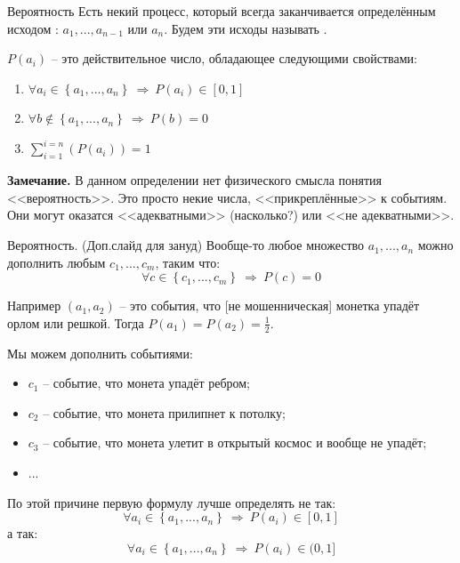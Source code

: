 \begin{frame}{Вероятность}
	Есть некий процесс, который всегда заканчивается определённым исходом : $a_1, ..., a_{n-1}$ или $a_n$.
	Будем эти исходы называть .
	
	 $P(a_i)$ -- это действительное число, обладающее следующими свойствами:
\begin{enumerate}
	\item $\forall a_i \in \left\{a_1, ..., a_n \right\} ~\Longrightarrow~ P(a_i) \in [0, 1]$
	\item $\forall b \notin \left\{a_1, ..., a_n \right\} ~\Longrightarrow~ P(b) = 0$
	\item $\sum_{i=1}^{i=n}\left(P(a_i)\right) = 1$
\end{enumerate}


\textbf{Замечание.}
В данном определении нет физического смысла понятия 
<<вероятность>>. Это просто некие числа, 
<<прикреплённые>> к событиям.
Они могут оказатся <<адекватными>> (насколько?)
или <<не адекватными>>.

\end{frame}

\begin{frame}{Вероятность. (Доп.слайд для зануд)}
\footnotesize
Вообще-то любое множество ${a_1, ..., a_n}$  
можно дополнить любым ${c_1, ..., c_m}$, 
таким что:
\begin{equation*}
	 \forall c \in \left\{c_1, ..., c_m \right\} ~\Longrightarrow~ P(c) = 0
\end{equation*}

Например $(a_1, a_2)$ -- это события, 
что [не мошенническая] монетка
упадёт орлом или решкой. Тогда $P(a_1) = P(a_2) = \frac{1}{2}$.

Мы можем дополнить событиями:
\begin{itemize}
	\item $c_1$ -- событие, что монета упадёт ребром;
	\item $c_2$ -- событие, что монета прилипнет к потолку;
	\item $c_3$ -- событие, что монета улетит в открытый космос и вообще не упадёт;
	\item ... 
\end{itemize}

По этой причине первую формулу лучше определять не так:
\begin{equation*}
 \forall a_i \in \left\{a_1, ..., a_n \right\} ~\Longrightarrow~ P(a_i) \in [0, 1]
\end{equation*}
а так:
\begin{equation*}
\forall a_i \in \left\{a_1, ..., a_n \right\} ~\Longrightarrow~ P(a_i) \in (0, 1]
\end{equation*}

\end{frame}


